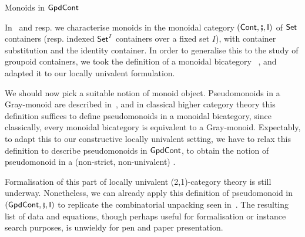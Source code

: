 \documentclass[a4paper]{easychair}
\begin{document}
\begin{section}{Monoids in \(\mathsf{GpdCont}\)}

  In~\cite{Uustalu2017} and resp. \cite{DePascalis2025} we
  characterise monoids in the monoidal category \((\mathsf{Cont}, {\operatorname{\mathbin\fatsemi}},
  \mathsf{I})\) of \(\mathsf{Set}\) containers (resp. indexed \(\mathsf{Set}^I\) containers
  over a fixed set \(I\)), with container substitution and the
  identity container. In order to generalise this to the study of
  groupoid containers, we took the definition of a monoidal bicategory
  ~\cite[Section 12.1]{Johnson2020}, and adapted it to our locally
  univalent formulation. 

  We should now pick a suitable notion of monoid object. Pseudomonoids
  in a Gray-monoid are described in~\cite[Section 3]{Day1997}, and in
  classical higher category theory this definition suffices to define
  pseudomonoids in a monoidal bicategory, since classically, every
  monoidal bicategory is equivalent to a Gray-monoid. Expectably, to
  adapt this to our constructive locally univalent setting, we have to
  relax this definition to describe pseudomonoids in \(\mathsf{GpdCont}\), to
  obtain the notion of pseudomonoid in a (non-strict, non-univalent)
  \lutc{}.

  Formalisation of this part of locally univalent (2,1)-category
  theory is still underway. Nonetheless, we can already apply this
  definition of pseudomonoid in \((\mathsf{GpdCont}, \operatorname{\mathbin\fatsemi}, \mathsf{I})\) to
  replicate the combinatorial unpacking seen in~\cite{Uustalu2017}.
  The resulting list of data and equations, though perhaps useful for
  formalisation or instance search purposes, is unwieldy for pen and
  paper presentation.

\end{section}
\end{document}
